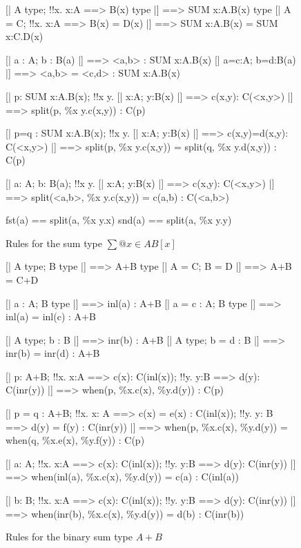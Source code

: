 \begin{figure} 
\begin{ttbox}
      [| A type;  !!x. x:A ==> B(x) type |] ==> SUM x:A.B(x) type
     [| A = C;  !!x. x:A ==> B(x) = D(x) 
          |] ==> SUM x:A.B(x) = SUM x:C.D(x)

      [| a : A;  b : B(a) |] ==> <a,b> : SUM x:A.B(x)
     [| a=c:A;  b=d:B(a) |] ==> <a,b> = <c,d> : SUM x:A.B(x)

      [| p: SUM x:A.B(x);  
             !!x y. [| x:A; y:B(x) |] ==> c(x,y): C(<x,y>) 
          |] ==> split(p, \%x y.c(x,y)) : C(p)

     [| p=q : SUM x:A.B(x); 
             !!x y. [| x:A; y:B(x) |] ==> c(x,y)=d(x,y): C(<x,y>)
          |] ==> split(p, \%x y.c(x,y)) = split(q, \%x y.d(x,y)) : C(p)

      [| a: A;  b: B(a);
             !!x y. [| x:A; y:B(x) |] ==> c(x,y): C(<x,y>)
          |] ==> split(<a,b>, \%x y.c(x,y)) = c(a,b) : C(<a,b>)

   fst(a) == split(a, \%x y.x)
   snd(a) == split(a, \%x y.y)
\end{ttbox}
\caption{Rules for the sum type $\sum@{x\in A}B[x]$} \label{ctt-sum}
\end{figure}


\begin{figure} 
\begin{ttbox}
       [| A type;  B type |] ==> A+B type
      [| A = C;  B = D |] ==> A+B = C+D

   [| a : A;  B type |] ==> inl(a) : A+B
  [| a = c : A;  B type |] ==> inl(a) = inl(c) : A+B

   [| A type;  b : B |] ==> inr(b) : A+B
  [| A type;  b = d : B |] ==> inr(b) = inr(d) : A+B

     [| p: A+B;
             !!x. x:A ==> c(x): C(inl(x));  
             !!y. y:B ==> d(y): C(inr(y))
          |] ==> when(p, \%x.c(x), \%y.d(y)) : C(p)

    [| p = q : A+B;
             !!x. x: A ==> c(x) = e(x) : C(inl(x));   
             !!y. y: B ==> d(y) = f(y) : C(inr(y))
          |] ==> when(p, \%x.c(x), \%y.d(y)) = 
                 when(q, \%x.e(x), \%y.f(y)) : C(p)

 [| a: A;
             !!x. x:A ==> c(x): C(inl(x));  
             !!y. y:B ==> d(y): C(inr(y))
          |] ==> when(inl(a), \%x.c(x), \%y.d(y)) = c(a) : C(inl(a))

 [| b: B;
             !!x. x:A ==> c(x): C(inl(x));  
             !!y. y:B ==> d(y): C(inr(y))
          |] ==> when(inr(b), \%x.c(x), \%y.d(y)) = d(b) : C(inr(b))
\end{ttbox}
\caption{Rules for the binary sum type $A+B$} \label{ctt-plus}
\end{figure}


